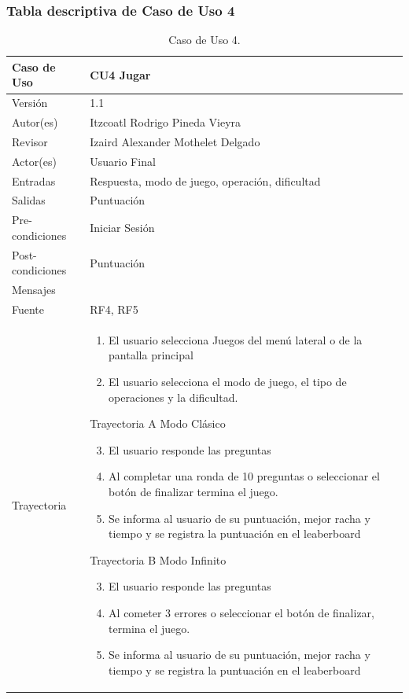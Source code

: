 \documentclass{article}
\begin{document}
\subsubsection{Tabla descriptiva de Caso de Uso 4}
\begin{table}[H]
\caption{Caso de Uso 4.}
\begin{tabular}{|M{4cm}|M{12cm}|}
\hline
Caso de Uso & CU4 Jugar\\ \hline
Versión & 1.1\\ \hline
Autor(es) & Itzcoatl Rodrigo Pineda Vieyra\\ \hline
Revisor & Izaird Alexander Mothelet Delgado \\ \hline
Actor(es) & Usuario Final \\ \hline
Entradas &  Respuesta, modo de juego, operación, dificultad \\ \hline
Salidas & Puntuación \\ \hline
Pre-condiciones & Iniciar Sesión \\ \hline
Post-condiciones & Puntuación\\ \hline
Mensajes & \\ \hline
Fuente & RF4, RF5 \\ \hline	
Trayectoria & 
\begin{enumerate}
\item El usuario selecciona Juegos del menú lateral o de la pantalla principal
\item El usuario selecciona el modo de juego, el tipo de operaciones y la dificultad.
\end{enumerate}

Trayectoria A Modo Clásico

\begin{enumerate}
\setcounter{enumi}{2}
\item El usuario responde  las preguntas 
\item Al completar una ronda de 10 preguntas o seleccionar el botón de finalizar termina el juego.
\item Se informa al usuario de su puntuación, mejor racha y tiempo y se registra la puntuación en el leaberboard
\end{enumerate}

Trayectoria B Modo Infinito

\begin{enumerate}
\setcounter{enumi}{2}
\item El usuario responde  las preguntas 
\item Al cometer 3 errores o seleccionar el botón de finalizar, termina el juego.
\item Se informa al usuario de su puntuación, mejor racha y tiempo y se registra la puntuación en el leaberboard
\end{enumerate} 


\end{tabular}
\end{table}
\end{document}
